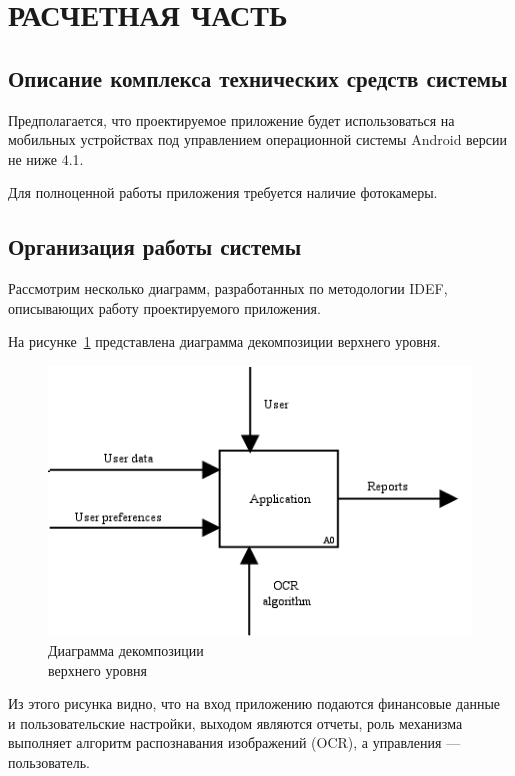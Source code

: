 \section[Расчетная часть]{РАСЧЕТНАЯ ЧАСТЬ}

\subsection{Описание комплекса технических средств системы}

Предполагается, что проектируемое приложение будет использоваться
на мобильных устройствах под управлением операционной системы Android
версии не ниже 4.1.

Для полноценной работы приложения требуется наличие фотокамеры.

\subsection{Организация работы системы}

Рассмотрим несколько диаграмм, разработанных по методологии IDEF,
описывающих работу проектируемого приложения.

На рисунке~\ref{fig:idef0_main} представлена диаграмма декомпозиции
верхнего уровня.

\begin{figure}[h!]
  \centering
  \includegraphics[width=130mm]{pic/idef0_main}
  \caption{Диаграмма декомпозиции \\ верхнего уровня}
  \label{fig:idef0_main}
\end{figure}

Из этого рисунка видно, что на вход приложению подаются финансовые данные
и пользовательские настройки, выходом являются отчеты,
роль механизма выполняет алгоритм распознавания изображений (OCR),
а управления --- пользователь.

